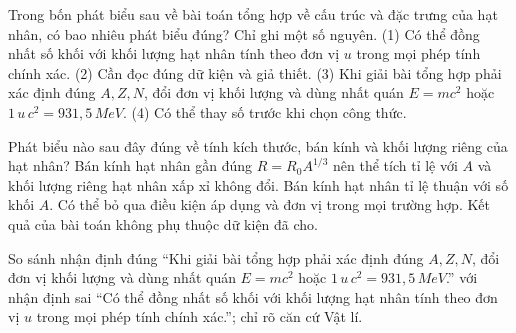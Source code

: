 \begin{ex}
Trong bốn phát biểu sau về bài toán tổng hợp về cấu trúc và đặc trưng của hạt nhân, có bao nhiêu phát biểu đúng? Chỉ ghi một số nguyên. (1) Có thể đồng nhất số khối với khối lượng hạt nhân tính theo đơn vị $u$ trong mọi phép tính chính xác. (2) Cần đọc đúng dữ kiện và giả thiết. (3) Khi giải bài tổng hợp phải xác định đúng $A,Z,N$, đổi đơn vị khối lượng và dùng nhất quán $E=mc^2$ hoặc $1\,u\,c^2=931,5\,MeV$. (4) Có thể thay số trước khi chọn công thức.
\end{ex}

\begin{ex}
Phát biểu nào sau đây đúng về tính kích thước, bán kính và khối lượng riêng của hạt nhân?
\choice
{\True Bán kính hạt nhân gần đúng $R=R_0A^{1/3}$ nên thể tích tỉ lệ với $A$ và khối lượng riêng hạt nhân xấp xỉ không đổi.}
{Bán kính hạt nhân tỉ lệ thuận với số khối $A$.}
{Có thể bỏ qua điều kiện áp dụng và đơn vị trong mọi trường hợp.}
{Kết quả của bài toán không phụ thuộc dữ kiện đã cho.}
\end{ex}

\begin{bt}
So sánh nhận định đúng “Khi giải bài tổng hợp phải xác định đúng $A,Z,N$, đổi đơn vị khối lượng và dùng nhất quán $E=mc^2$ hoặc $1\,u\,c^2=931,5\,MeV$.” với nhận định sai “Có thể đồng nhất số khối với khối lượng hạt nhân tính theo đơn vị $u$ trong mọi phép tính chính xác.”; chỉ rõ căn cứ Vật lí.
\end{bt}

